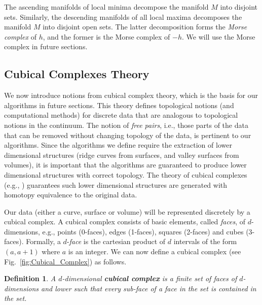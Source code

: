 \documentclass[10pt,journal,compsoc]{IEEEtran}
\newtheorem{defn}{Definition}
\begin{document}
The ascending manifolds of local minima decompose the manifold $M$
into disjoint sets. Similarly, the descending manifolds of all local
maxima decomposes the manifold $M$ into disjoint open sets. The latter
decomposition forms the \emph{Morse complex} of $h$, and the former is
the Morse complex of $-h$. We will use the Morse complex in future
sections.


\subsection{Cubical Complexes Theory}

We now introduce notions from cubical complex theory, which is the
basis for our algorithms in future sections. This theory defines
topological notions (and computational methods) for discrete data that
are analogous to topological notions in the continuum. The notion of
\emph{free pairs}, i.e., those parts of the data that can be removed
without changing topology of the data, is pertinent to our
algorithms. Since the algorithms we define require the extraction of
lower dimensional structures (ridge curves from surfaces, and valley
surfaces from volumes), it is important that the algorithms are
guaranteed to produce lower dimensional structures with correct
topology. The theory of cubical complexes (e.g.,
\cite{kaczynski2006computational,chaussard2009surface}) guarantees
such lower dimensional structures are generated with homotopy
equivalence to the original data.

Our data (either a curve, surface or volume) will be represented
discretely by a cubical complex. A cubical complex consists of basic
elements, called \emph{faces}, of $d$-dimensions, e.g., points
(0-faces), edges (1-faces), squares (2-faces) and cubes
(3-faces). Formally, a $d$-\emph{face} is the cartesian product of $d$
intervals of the form $(a,a+1)$ where $a$ is an integer. We can now
define a cubical complex (see Fig.~\ref{fig:Cubical_Complex}) as
follows.

\begin{defn}
  A $d$-dimensional {\bf cubical complex} is a finite set of faces of
  $d$-dimensions and lower such that every sub-face of a face in the
  set is contained in the set.
\end{defn}
\end{document}
